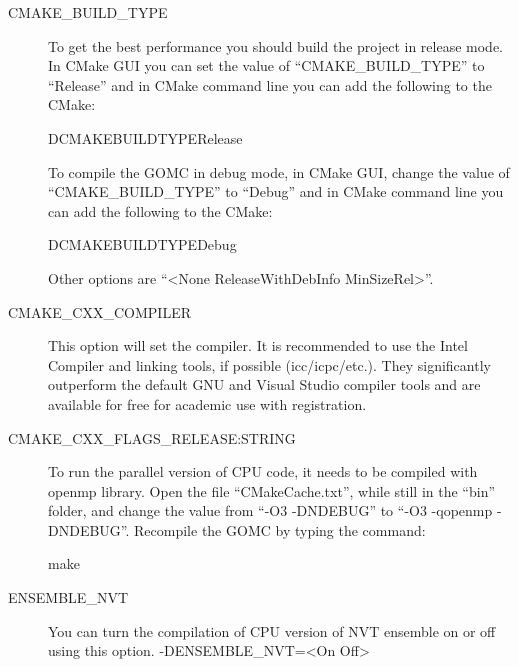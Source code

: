 \documentclass[letterpaper,10pt,english]{sphinxmanual}
\begin{document}
\begin{description}
\item[{CMAKE\_BUILD\_TYPE}] \leavevmode
To get the best performance you should build the project in release mode. In CMake GUI you can set the value of “CMAKE\_BUILD\_TYPE” to “Release” and in CMake command line you can add the following to the CMake:

%
\begin{sphinxVerbatim}[commandchars=\\\{\}]
\PYGZhy{}DCMAKE\PYGZus{}BUILD\PYGZus{}TYPERelease
\end{sphinxVerbatim}

To compile the GOMC in debug mode, in CMake GUI, change the value of “CMAKE\_BUILD\_TYPE” to “Debug” and in CMake command line you can add the following to the CMake:

%
\begin{sphinxVerbatim}[commandchars=\\\{\}]
\PYGZhy{}DCMAKE\PYGZus{}BUILD\PYGZus{}TYPEDebug
\end{sphinxVerbatim}

Other options are “\textless{}None \textbar{} ReleaseWithDebInfo \textbar{} MinSizeRel\textgreater{}”.

\item[{CMAKE\_CXX\_COMPILER}] \leavevmode
This option will set the compiler. It is recommended to use the Intel Compiler and linking tools, if possible (icc/icpc/etc.). They significantly outperform the default GNU and Visual Studio compiler tools and are available for free for academic use with registration.

\item[{CMAKE\_CXX\_FLAGS\_RELEASE:STRING}] \leavevmode
To run the parallel version of CPU code, it needs to be compiled with openmp library. Open the file “CMakeCache.txt”, while still in the “bin” folder, and change the value from “-O3 -DNDEBUG” to “-O3 -qopenmp -DNDEBUG”. Recompile the GOMC by typing the command:

%
\begin{sphinxVerbatim}[commandchars=\\\{\}]
\PYGZdl{} make
\end{sphinxVerbatim}

\item[{ENSEMBLE\_NVT}] \leavevmode
You can turn the compilation of CPU version of NVT ensemble on or off using this option.
-DENSEMBLE\_NVT=\textless{}On \textbar{} Off\textgreater{}


\end{description}
\end{document}
